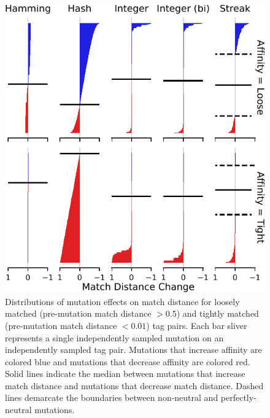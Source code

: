 \begin{figure}
\begin{center}

\includegraphics[width=\columnwidth]{img/mutational_step/bitweight=0dot5+seed=1+title=low-mutational-step+_data_hathash_hash=95a57768de56995a+_script_fullcat_hash=78f9965681c3a44b+ext=}
\caption{
Distributions of mutation effects on match distance for loosely matched (pre-mutation match distance $> 0.5$) and tightly matched (pre-mutation match distance $< 0.01$) tag pairs.
Each bar sliver represents a single independently sampled mutation on an independently sampled tag pair.
Mutations that increase affinity are colored blue and mutations that decrease affinity are colored red.
Solid lines indicate the median between mutations that increase match distance and mutations that decrease match distance.
Dashed lines demarcate the boundaries between non-neutral and perfectly-neutral mutations.
}
\label{fig:mutational_step}

\end{center}
\end{figure}
